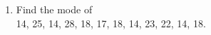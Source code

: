 \renewcommand{\theequation}{\theenumi}
\begin{enumerate}[label=\thesection.\arabic*.,ref=\thesection.\theenumi]
\item Find the mode of \\
14, 25, 14, 28, 18, 17, 18, 14, 23, 22, 14, 18.

\end{enumerate}